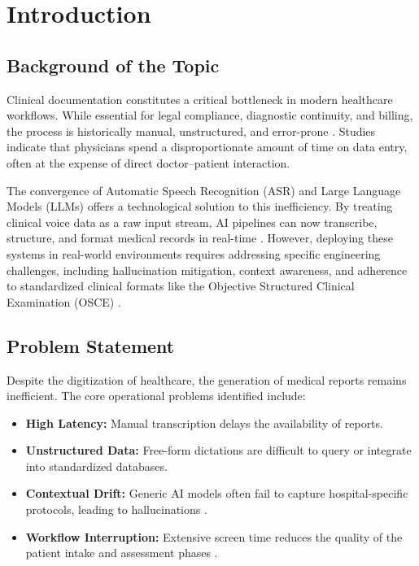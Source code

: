 
\chapter{Introduction}\label{chapter:intro}

\section{Background of the Topic}\label{sec:intro:background}

Clinical documentation constitutes a critical bottleneck in modern healthcare workflows. While essential for legal compliance, diagnostic continuity, and billing, the process is historically manual, unstructured, and error-prone \cite{gawande2018why}. Studies indicate that physicians spend a disproportionate amount of time on data entry, often at the expense of direct doctor–patient interaction.

The convergence of Automatic Speech Recognition (ASR) and Large Language Models (LLMs) offers a technological solution to this inefficiency. By treating clinical voice data as a raw input stream, AI pipelines can now transcribe, structure, and format medical records in real-time \cite{thirunavukarasu2023large}. However, deploying these systems in real-world environments requires addressing specific engineering challenges, including hallucination mitigation, context awareness, and adherence to standardized clinical formats like the Objective Structured Clinical Examination (OSCE) \cite{harden1975assessment}.

\section{Problem Statement}\label{sec:intro:problem}

Despite the digitization of healthcare, the generation of medical reports remains inefficient. The core operational problems identified include:

\begin{itemize}
    \item \textbf{High Latency:} Manual transcription delays the availability of reports.
    \item \textbf{Unstructured Data:} Free-form dictations are difficult to query or integrate into standardized databases.
    \item \textbf{Contextual Drift:} Generic AI models often fail to capture hospital-specific protocols, leading to hallucinations . %
    \item \textbf{Workflow Interruption:} Extensive screen time reduces the quality of the patient intake and assessment phases \cite{gawande2018why}.
\end{itemize}

